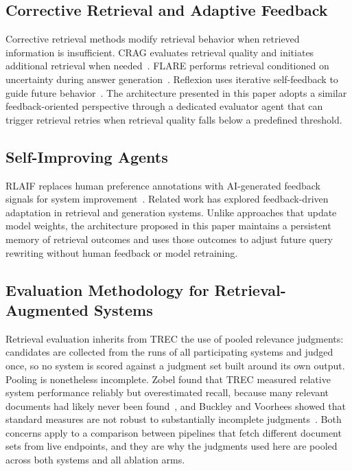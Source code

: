 \documentclass[acmsmall,review,anonymous,screen]{acmart}
\begin{document}
\subsection{Corrective Retrieval and Adaptive Feedback}

Corrective retrieval methods modify retrieval behavior when retrieved
information is insufficient. CRAG evaluates retrieval quality and
initiates additional retrieval when needed~\cite{yan2024crag}. FLARE
performs retrieval conditioned on uncertainty during answer
generation~\cite{jiang2023flare}. Reflexion uses iterative self-feedback
to guide future behavior~\cite{shinn2023reflexion}. The architecture
presented in this paper adopts a similar feedback-oriented perspective
through a dedicated evaluator agent that can trigger retrieval retries
when retrieval quality falls below a predefined threshold.

\subsection{Self-Improving Agents}

RLAIF replaces human preference annotations with AI-generated feedback
signals for system improvement~\cite{bai2022constitutional}. Related
work has explored feedback-driven adaptation in retrieval and generation
systems. Unlike approaches that update model weights, the architecture
proposed in this paper maintains a persistent memory of retrieval
outcomes and uses those outcomes to adjust future query rewriting
without human feedback or model retraining.

\subsection{Evaluation Methodology for Retrieval-Augmented Systems}

Retrieval evaluation inherits from TREC the use of pooled relevance judgments:
candidates are collected from the runs of all participating systems and judged
once, so no system is scored against a judgment set built around its own output.
Pooling is nonetheless incomplete. Zobel found that TREC measured relative system
performance reliably but overestimated recall, because many relevant documents
had likely never been found~\cite{zobel1998reliable}, and Buckley and Voorhees
showed that standard measures are not robust to substantially incomplete
judgments~\cite{buckley2004incomplete}. Both concerns apply to a comparison
between pipelines that fetch different document sets from live endpoints, and
they are why the judgments used here are pooled across both systems and all
ablation arms.
\end{document}
